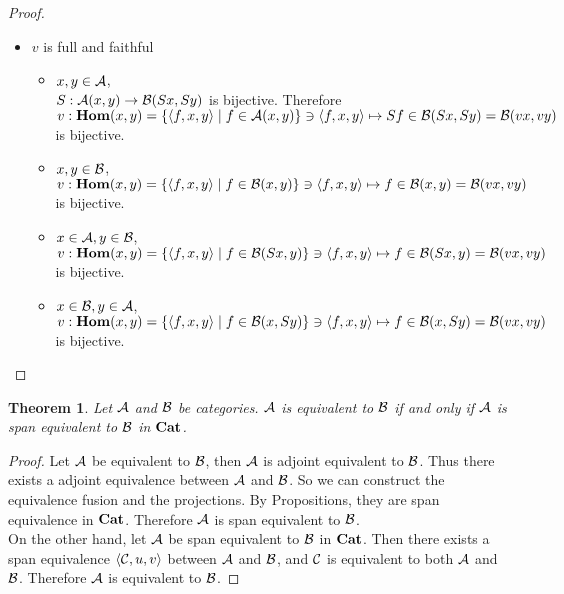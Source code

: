 \documentclass[12pt]{article}
\theoremstyle{plain}
\newtheorem{theorem}{Theorem}[section]
\theoremstyle{definition}
\begin{document}
\begin{proof}
\begin{itemize}
 \item $v$ is full and faithful
 \begin{itemize}
 \item $x,y \in {\cal A}$, \\
$S:{\cal A}{\rm (}x,y{\rm )} \rightarrow {\cal B}{\rm (}Sx,Sy{\rm )}$ is bijective. Therefore $v:{\bf Hom}{\rm (}x,y{\rm )}=\{ \langle f,x,y \rangle \mid f \in {\cal A}(x,y) \} \ni \langle f,x,y \rangle \mapsto Sf \in {\cal B}{\rm (}Sx,Sy{\rm )}={\cal B}{\rm (}vx,vy{\rm )}$ is bijective.
 \item $x,y \in {\cal B}$, \\
$v:{\bf Hom}{\rm (}x,y{\rm )}=\{ \langle f,x,y \rangle \mid f \in {\cal B}(x,y) \} \ni \langle f,x,y \rangle \mapsto f \in {\cal B}{\rm (}x,y{\rm )}={\cal B}{\rm (}vx,vy{\rm )}$ is bijective.
 \item $x \in {\cal A}, y \in {\cal B}$, \\
$v:{\bf Hom}{\rm (}x,y{\rm )}=\{ \langle f,x,y \rangle \mid f \in {\cal B}(Sx,y) \} \ni \langle f,x,y \rangle \mapsto f \in {\cal B}{\rm (}Sx,y{\rm )}={\cal B}{\rm (}vx,vy{\rm )}$ is bijective.
 \item $x \in {\cal B} , y \in {\cal A}$, \\
$v:{\bf Hom}{\rm (}x,y{\rm )}=\{ \langle f,x,y \rangle \mid f \in {\cal B}(x,Sy) \} \ni \langle f,x,y \rangle \mapsto f \in {\cal B}{\rm (}x,Sy{\rm )}={\cal B}{\rm (}vx,vy{\rm )}$ is bijective.
 \end{itemize}
 
\end{itemize}
\end{proof}


\begin{theorem}
Let ${\cal A}$ and ${\cal B}$ be categories. ${\cal A}$ is equivalent to ${\cal B}$ 
if and only if ${\cal A}$ is span equivalent to ${\cal B}$ in ${\bf Cat}$. 
\end{theorem}

\begin{proof} Let ${\cal A}$ be equivalent to ${\cal B}$, then ${\cal A}$ is adjoint equivalent to ${\cal B}$. Thus there exists a adjoint equivalence between ${\cal A}$ and ${\cal B}$. So we can construct the equivalence fusion and the projections. By Propositions, they are span equivalence in ${\bf Cat}$. Therefore ${\cal A}$ is span equivalent to ${\cal B}$. \\
On the other hand, let ${\cal A}$ be span equivalent to ${\cal B}$ in ${\bf Cat}$. Then there exists a span equivalence $\langle {\cal C},u,v \rangle$ between ${\cal A}$ and ${\cal B}$, and ${\cal C}$ is equivalent to both ${\cal A}$ and ${\cal B}$. Therefore ${\cal A}$ is equivalent to ${\cal B}$.
\end{proof}
\end{document}
